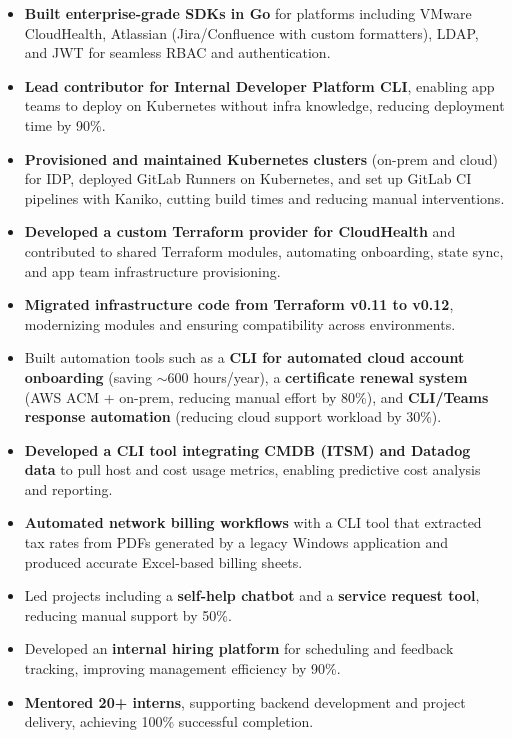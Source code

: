 \begin{itemize}
    \item \textbf{Built enterprise-grade SDKs in Go} for platforms including VMware CloudHealth, Atlassian (Jira/Confluence with custom formatters), LDAP, and JWT for seamless RBAC and authentication.
    \item \textbf{Lead contributor for Internal Developer Platform CLI}, enabling app teams to deploy on Kubernetes without infra knowledge, reducing deployment time by 90\%.
    \item \textbf{Provisioned and maintained Kubernetes clusters} (on-prem and cloud) for IDP, deployed GitLab Runners on Kubernetes, and set up GitLab CI pipelines with Kaniko, cutting build times and reducing manual interventions.
    \item \textbf{Developed a custom Terraform provider for CloudHealth} and contributed to shared Terraform modules, automating onboarding, state sync, and app team infrastructure provisioning.
    \item \textbf{Migrated infrastructure code from Terraform v0.11 to v0.12}, modernizing modules and ensuring compatibility across environments.
    \item Built automation tools such as a \textbf{CLI for automated cloud account onboarding} (saving $\sim$600 hours/year), a \textbf{certificate renewal system} (AWS ACM + on-prem, reducing manual effort by 80\%), and \textbf{CLI/Teams response automation} (reducing cloud support workload by 30\%).
    \item \textbf{Developed a CLI tool integrating CMDB (ITSM) and Datadog data} to pull host and cost usage metrics, enabling predictive cost analysis and reporting.
    \item \textbf{Automated network billing workflows} with a CLI tool that extracted tax rates from PDFs generated by a legacy Windows application and produced accurate Excel-based billing sheets.
    \item Led projects including a \textbf{self-help chatbot} and a \textbf{service request tool}, reducing manual support by 50\%.
    \item Developed an \textbf{internal hiring platform} for scheduling and feedback tracking, improving management efficiency by 90\%.
    \item \textbf{Mentored 20+ interns}, supporting backend development and project delivery, achieving 100\% successful completion.
\end{itemize}


